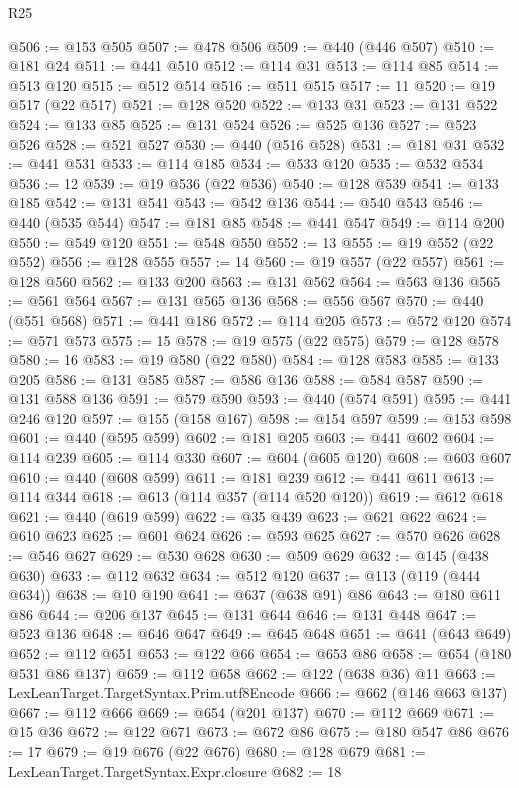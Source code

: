 \begin{lexlean}{R25}
\begin{coremodule}
@506 := @153 @505
@507 := @478 @506
@509 := @440 (@446 @507)
@510 := @181 @24
@511 := @441 @510
@512 := @114 @31
@513 := @114 @85
@514 := @513 @120
@515 := @512 @514
@516 := @511 @515
@517 := 11
@520 := @19 @517 (@22 @517)
@521 := @128 @520
@522 := @133 @31
@523 := @131 @522
@524 := @133 @85
@525 := @131 @524
@526 := @525 @136
@527 := @523 @526
@528 := @521 @527
@530 := @440 (@516 @528)
@531 := @181 @31
@532 := @441 @531
@533 := @114 @185
@534 := @533 @120
@535 := @532 @534
@536 := 12
@539 := @19 @536 (@22 @536)
@540 := @128 @539
@541 := @133 @185
@542 := @131 @541
@543 := @542 @136
@544 := @540 @543
@546 := @440 (@535 @544)
@547 := @181 @85
@548 := @441 @547
@549 := @114 @200
@550 := @549 @120
@551 := @548 @550
@552 := 13
@555 := @19 @552 (@22 @552)
@556 := @128 @555
@557 := 14
@560 := @19 @557 (@22 @557)
@561 := @128 @560
@562 := @133 @200
@563 := @131 @562
@564 := @563 @136
@565 := @561 @564
@567 := @131 @565 @136
@568 := @556 @567
@570 := @440 (@551 @568)
@571 := @441 @186
@572 := @114 @205
@573 := @572 @120
@574 := @571 @573
@575 := 15
@578 := @19 @575 (@22 @575)
@579 := @128 @578
@580 := 16
@583 := @19 @580 (@22 @580)
@584 := @128 @583
@585 := @133 @205
@586 := @131 @585
@587 := @586 @136
@588 := @584 @587
@590 := @131 @588 @136
@591 := @579 @590
@593 := @440 (@574 @591)
@595 := @441 @246 @120
@597 := @155 (@158 @167)
@598 := @154 @597
@599 := @153 @598
@601 := @440 (@595 @599)
@602 := @181 @205
@603 := @441 @602
@604 := @114 @239
@605 := @114 @330
@607 := @604 (@605 @120)
@608 := @603 @607
@610 := @440 (@608 @599)
@611 := @181 @239
@612 := @441 @611
@613 := @114 @344
@618 := @613 (@114 @357 (@114 @520 @120))
@619 := @612 @618
@621 := @440 (@619 @599)
@622 := @35 @439
@623 := @621 @622
@624 := @610 @623
@625 := @601 @624
@626 := @593 @625
@627 := @570 @626
@628 := @546 @627
@629 := @530 @628
@630 := @509 @629
@632 := @145 (@438 @630)
@633 := @112 @632
@634 := @512 @120
@637 := @113 (@119 (@444 @634))
@638 := @10 @190
@641 := @637 (@638 @91) @86
@643 := @180 @611 @86
@644 := @206 @137
@645 := @131 @644
@646 := @131 @448
@647 := @523 @136
@648 := @646 @647
@649 := @645 @648
@651 := @641 (@643 @649)
@652 := @112 @651
@653 := @122 @66
@654 := @653 @86
@658 := @654 (@180 @531 @86 @137)
@659 := @112 @658
@662 := @122 (@638 @36) @11
@663 := LexLeanTarget.TargetSyntax.Prim.utf8Encode
@666 := @662 (@146 @663 @137)
@667 := @112 @666
@669 := @654 (@201 @137)
@670 := @112 @669
@671 := @15 @36
@672 := @122 @671
@673 := @672 @86
@675 := @180 @547 @86
@676 := 17
@679 := @19 @676 (@22 @676)
@680 := @128 @679
@681 := LexLeanTarget.TargetSyntax.Expr.closure
@682 := 18

\end{coremodule}
\end{lexlean}

